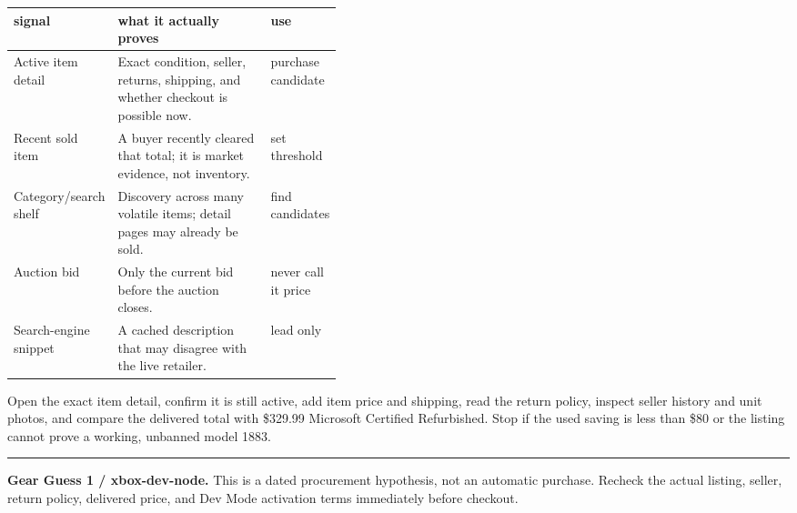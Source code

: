 \documentclass[10pt,letterpaper]{article}
\begin{document}
\begin{tabularx}{\linewidth}{@{}p{0.23\linewidth}Y p{0.19\linewidth}@{}}
\toprule
\textbf{signal} & \textbf{what it actually proves} & \textbf{use} \\
\midrule
Active item detail & Exact condition, seller, returns, shipping, and whether checkout is possible now. & purchase candidate \\
Recent sold item & A buyer recently cleared that total; it is market evidence, not inventory. & set threshold \\
Category/search shelf & Discovery across many volatile items; detail pages may already be sold. & find candidates \\
Auction bid & Only the current bid before the auction closes. & never call it price \\
Search-engine snippet & A cached description that may disagree with the live retailer. & lead only \\
\bottomrule
\end{tabularx}

\begin{gearwarning}
Open the exact item detail, confirm it is still active, add item price and
shipping, read the return policy, inspect seller history and unit photos, and
compare the delivered total with \$329.99 Microsoft Certified Refurbished.
Stop if the used saving is less than \$80 or the listing cannot prove a working,
unbanned model 1883.
\end{gearwarning}

\vfill
{\color{acpink}\rule{\linewidth}{1pt}}\par
{\small\sffamily
\textbf{Gear Guess 1 / xbox-dev-node.}
This is a dated procurement hypothesis, not an automatic purchase. Recheck the
actual listing, seller, return policy, delivered price, and Dev Mode activation
terms immediately before checkout.}
\end{document}
